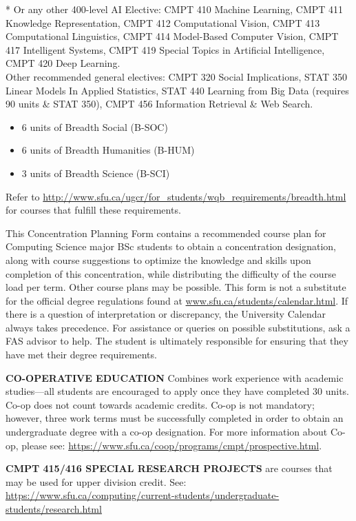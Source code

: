\documentclass[11pt]{article}
\newcommand{\ElectiveFootnote}{%
\footnotesize
* Or any other 400-level AI Elective: CMPT 410 Machine Learning, CMPT 411
Knowledge Representation, CMPT 412 Computational Vision, CMPT 413
Computational Linguistics, CMPT 414 Model-Based Computer Vision, CMPT 417
Intelligent Systems, CMPT 419 Special Topics in Artificial Intelligence,
CMPT 420 Deep Learning.\\[2pt]
Other recommended general electives: CMPT 320 Social Implications, STAT 350
Linear Models In Applied Statistics, STAT 440 Learning from Big Data
(requires 90 units \& STAT 350), CMPT 456 Information Retrieval \& Web
Search.%
}
\begin{document}
\vspace{4pt}
\ElectiveFootnote

\vspace{10pt}

\begin{tcolorbox}[colback=sfugray, colframe=sfured, boxrule=0.8pt,
  title=WQB Breadth Requirements, fonttitle=\bfseries\color{white},
  colbacktitle=sfured, left=6pt, right=6pt]
\begin{itemize}
\item 6 units of Breadth Social (B-SOC)
\item 6 units of Breadth Humanities (B-HUM)
\item 3 units of Breadth Science (B-SCI)
\end{itemize}
Refer to \url{http://www.sfu.ca/ugcr/for_students/wqb_requirements/breadth.html}
for courses that fulfill these requirements.
\end{tcolorbox}

\vspace{8pt}
\footnotesize
This Concentration Planning Form contains a recommended course plan for
Computing Science major BSc students to obtain a concentration designation,
along with course suggestions to optimize the knowledge and skills upon
completion of this concentration, while distributing the difficulty of the
course load per term. Other course plans may be possible. This form is not a
substitute for the official degree regulations found at
\url{www.sfu.ca/students/calendar.html}. If there is a question of
interpretation or discrepancy, the University Calendar always takes
precedence. For assistance or queries on possible substitutions, ask a FAS
advisor to help. The student is ultimately responsible for ensuring that they
have met their degree requirements.

\vspace{6pt}
\textbf{CO-OPERATIVE EDUCATION} Combines work experience with academic
studies---all students are encouraged to apply once they have completed 30
units. Co-op does not count towards academic credits. Co-op is not
mandatory; however, three work terms must be successfully completed in order
to obtain an undergraduate degree with a co-op designation. For more
information about Co-op, please see:
\url{https://www.sfu.ca/coop/programs/cmpt/prospective.html}.

\vspace{6pt}
\textbf{CMPT 415/416 SPECIAL RESEARCH PROJECTS} are courses that may be used
for upper division credit. See:
\url{https://www.sfu.ca/computing/current-students/undergraduate-students/research.html}
\end{document}
